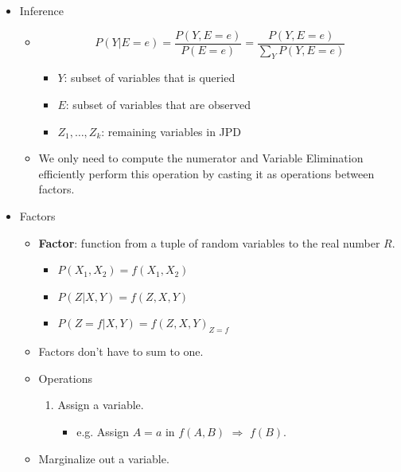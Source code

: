 \documentclass{article}
\begin{document}
\begin{itemize}
    \item Inference
        \begin{itemize}
            \item
            \begin{equation*}
                P(Y|E=e) = \frac{P(Y, E=e)}{P(E=e)} = \frac{P(Y, E=e)}{\sum\limits_{Y} P(Y, E=e)}
            \end{equation*}
            \begin{itemize}
                \item $Y$: subset of variables that is queried
                \item $E$: subset of variables that are observed
                \item $Z_1, \ldots, Z_k$: remaining variables in JPD
            \end{itemize}
            \item We only need to compute the numerator and Variable Elimination efficiently perform this operation by casting it as operations between factors.
        \end{itemize}
    \item Factors
        \begin{itemize}
            \item \textbf{Factor}: function from a tuple of random variables to the real number $R$.
                \begin{itemize}
                    \item $P(X_1, X_2) = f(X_1, X_2)$
                    \item $P(Z|X, Y) = f(Z, X, Y)$
                    \item $P(Z=f|X, Y) = f(Z, X, Y)_{Z=f}$
                \end{itemize}
            \item Factors don't have to sum to one.
            \item Operations
                \begin{enumerate}
                    \item Assign a variable.
                        \begin{itemize}
                            \item e.g. Assign $A=a$ in $f(A, B)$ $\Rightarrow$ $f(B)$.
                        \end{itemize}
                \end{enumerate}
            \item Marginalize out a variable.

\end{itemize}
\end{itemize}
\end{document}
